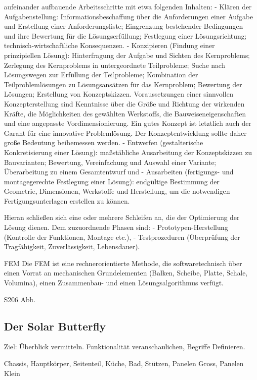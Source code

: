 aufeinander aufbauende Arbeitsschritte mit etwa folgenden Inhalten:
  - Klären der Aufgabenstellung: Informationsbeschaffung über die Anforderungen einer Aufgabe und Erstellung einer Anforderungsliste; Eingrenzung bestehender Bedingungen und ihre Bewertung für die Lösungserfüllung; Festlegung einer Lösungsrichtung; technisch-wirtschaftliche Konsequenzen.
  - Konzipieren (Findung einer prinzipiellen Lösung): Hinterfragung der Aufgabe und Sichten des Kernproblems; Zerlegung des Kernproblems in untergeordnete Teilprobleme; Suche nach Lösungswegen zur Erfüllung der Teilprobleme; Kombination der Teilproblemlösungen zu Lösungsansätzen für das Kernproblem; Bewertung der Lösungen; Erstellung von Konzeptskizzen. Voraussetzungen einer sinnvollen Konzepterstellung sind Kenntnisse über die Größe und Richtung der wirkenden Kräfte, die Möglichkeiten des gewählten Werkstoffs, die Bauweiseneigenschaften und eine angepasste Vordimensionierung. Ein gutes Konzept ist letztlich auch der Garant für eine innovative Problemlösung. Der Konzeptentwicklung sollte daher große Bedeutung beibemessen werden.
  - Entwerfen (gestalterische Konkretisierung einer Lösung): maßstäbliche Ausarbeitung der Konzeptskizzen zu Bauvarianten; Bewertung, Vereinfachung und Auswahl einer Variante; Überarbeitung zu einem Gesamtentwurf und
  - Ausarbeiten (fertigungs- und montagegerechte Festlegung einer Lösung): endgültige Bestimmung der Geometrie, Dimensionen, Werkstoffe und Herstellung, um die notwendigen Fertigungsunterlagen erstellen zu können.

Hieran schließen sich eine oder mehrere Schleifen an, die der Optimierung der Lösung dienen. Dem zuzuordnende Phasen sind:
  - Prototypen-Herstellung (Kontrolle der Funktionen, Montage etc.),
  - Testprozeduren (Überprüfung der Tragfähigkeit, Zuverlässigkeit, Lebensdauer).

FEM
  Die FEM ist eine rechnerorientierte Methode, die softwaretechnisch über einen Vorrat an mechanischen Grundelementen (Balken, Scheibe, Platte, Schale, Volumina), einen Zusammenbau- und einen Lösungsalgorithmus verfügt.

S206 Abb.

\subsection{Der Solar Butterfly}
Ziel: Überblick vermitteln. Funktionalität veranschaulichen, Begriffe Definieren.

Chassis, Hauptkörper, Seitenteil, Küche, Bad, Stützen, Panelen Gross, Panelen Klein

\newpage
